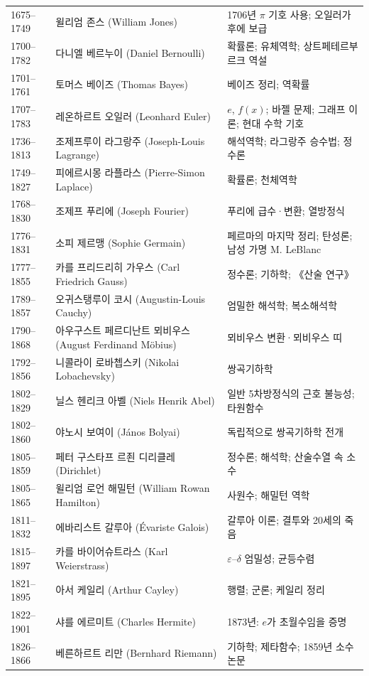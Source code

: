 \begin{center}
\begin{longtable}{@{}L{0.16\textwidth}L{0.24\textwidth}L{0.52\textwidth}@{}}
1675--1749 & 윌리엄 존스 (William Jones) & 1706년 $\pi$ 기호 사용; 오일러가 후에 보급\\
1700--1782 & 다니엘 베르누이 (Daniel Bernoulli) & 확률론; 유체역학; 상트페테르부르크 역설\\
1701--1761 & 토머스 베이즈 (Thomas Bayes) & 베이즈 정리; 역확률\\
1707--1783 & 레온하르트 오일러 (Leonhard Euler) & $e$, $f(x)$; 바젤 문제; 그래프 이론; 현대 수학 기호\\
1736--1813 & 조제프루이 라그랑주 (Joseph-Louis Lagrange) & 해석역학; 라그랑주 승수법; 정수론\\
1749--1827 & 피에르시몽 라플라스 (Pierre-Simon Laplace) & 확률론; 천체역학\\
1768--1830 & 조제프 푸리에 (Joseph Fourier) & 푸리에 급수·변환; 열방정식\\
1776--1831 & 소피 제르맹 (Sophie Germain) & 페르마의 마지막 정리; 탄성론; 남성 가명 M. LeBlanc\\
1777--1855 & 카를 프리드리히 가우스 (Carl Friedrich Gauss) & 정수론; 기하학; 《산술 연구》\\
1789--1857 & 오귀스탱루이 코시 (Augustin-Louis Cauchy) & 엄밀한 해석학; 복소해석학\\
1790--1868 & 아우구스트 페르디난트 뫼비우스 (August Ferdinand Möbius) & 뫼비우스 변환·뫼비우스 띠\\
1792--1856 & 니콜라이 로바쳅스키 (Nikolai Lobachevsky) & 쌍곡기하학\\
1802--1829 & 닐스 헨리크 아벨 (Niels Henrik Abel) & 일반 5차방정식의 근호 불능성; 타원함수\\
1802--1860 & 야노시 보여이 (János Bolyai) & 독립적으로 쌍곡기하학 전개\\
1805--1859 & 페터 구스타프 르죈 디리클레 (Dirichlet) & 정수론; 해석학; 산술수열 속 소수\\
1805--1865 & 윌리엄 로언 해밀턴 (William Rowan Hamilton) & 사원수; 해밀턴 역학\\
1811--1832 & 에바리스트 갈루아 (Évariste Galois) & 갈루아 이론; 결투와 20세의 죽음\\
1815--1897 & 카를 바이어슈트라스 (Karl Weierstrass) & $\varepsilon$--$\delta$ 엄밀성; 균등수렴\\
1821--1895 & 아서 케일리 (Arthur Cayley) & 행렬; 군론; 케일리 정리\\
1822--1901 & 샤를 에르미트 (Charles Hermite) & 1873년: $e$가 초월수임을 증명\\
1826--1866 & 베른하르트 리만 (Bernhard Riemann) & 기하학; 제타함수; 1859년 소수 논문\\

\end{longtable}
\end{center}
